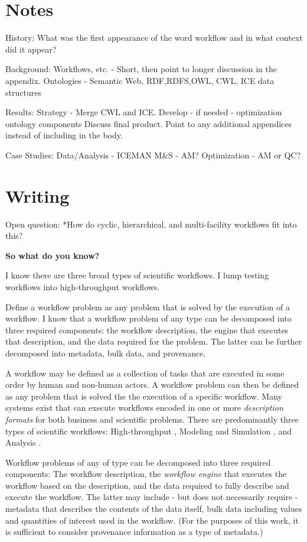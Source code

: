 \section{Notes}

History:
What was the first appearance of the word workflow and in what context did it
appear?

Background:
Workflows, etc. - Short, then point to longer discussion in the appendix.
Ontologies - Semantic Web, {RDF,RDFS,OWL}, CWL, ICE data structures

Results:
Strategy - Merge CWL and ICE. Develop - if needed - optimization ontology components
Discuss final product. Point to any additional appendices instead of including in the body.

Case Studies:
Data/Analysis - ICEMAN
M\&S - AM?
Optimization - AM or QC?

\section{Writing}

Open question:
*How do cyclic, hierarchical, and multi-facility workflows fit into this?

\textbf{So what do you know?}

I know there are three broad types of scientific workflows. I lump testing
workflows into high-throughput workflows.

Define a workflow problem as any problem that is solved by the execution of a
workflow. I know that a workflow problem of any type can be decomposed into
three required components: the workflow description, the engine that executes
that description, and the data required for the problem. The latter can be
further decomposed into metadata, bulk data, and provenance.

A workflow may be defined as a collection of tasks that are executed in some
order by human and non-human actors. A workflow problem can then be defined as
any problem that is solved the the execution of a specific workflow. Many
systems exist that can execute workflows encoded in one or more
\textit{description formats} for both business and scientific problems. There
are predominantly three types of scientific workflows: High-throughput \cite{},
Modeling and Simulation \cite{}, and Analysis \cite{}.

Workflow problems of any of type can be decomposed into three required
components: The workflow description, the \textit{workflow engine} that
executes the workflow based on the description, and the data required to fully
describe and execute the workflow. The latter may include - but does not
necessarily require - metadata that describes the contents of the data itself,
bulk data including values and quantities of interest used in the workflow.
(For the purposes of this work, it is sufficient to consider provenance
information as a type of metadata.)

